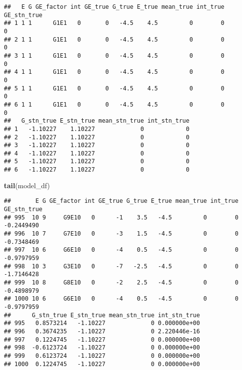 \documentclass[]{article}
\newenvironment{Shaded}{\begin{snugshade}}{\end{snugshade}}
\newcommand{\DataTypeTok}[1]{\textcolor[rgb]{0.13,0.29,0.53}{#1}}
\newcommand{\DecValTok}[1]{\textcolor[rgb]{0.00,0.00,0.81}{#1}}
\newcommand{\KeywordTok}[1]{\textcolor[rgb]{0.13,0.29,0.53}{\textbf{#1}}}
\newcommand{\NormalTok}[1]{#1}
\newcommand{\OperatorTok}[1]{\textcolor[rgb]{0.81,0.36,0.00}{\textbf{#1}}}
\begin{document}
\begin{verbatim}
##   E G GE_factor int GE_true G_true E_true mean_true int_true GE_stn_true
## 1 1 1      G1E1   0       0   -4.5    4.5         0        0           0
## 2 1 1      G1E1   0       0   -4.5    4.5         0        0           0
## 3 1 1      G1E1   0       0   -4.5    4.5         0        0           0
## 4 1 1      G1E1   0       0   -4.5    4.5         0        0           0
## 5 1 1      G1E1   0       0   -4.5    4.5         0        0           0
## 6 1 1      G1E1   0       0   -4.5    4.5         0        0           0
##   G_stn_true E_stn_true mean_stn_true int_stn_true
## 1   -1.10227    1.10227             0            0
## 2   -1.10227    1.10227             0            0
## 3   -1.10227    1.10227             0            0
## 4   -1.10227    1.10227             0            0
## 5   -1.10227    1.10227             0            0
## 6   -1.10227    1.10227             0            0
\end{verbatim}

\begin{Shaded}
\begin{Highlighting}[]
    \KeywordTok{tail}\NormalTok{(model_df)}
\end{Highlighting}
\end{Shaded}

\begin{verbatim}
##       E G GE_factor int GE_true G_true E_true mean_true int_true GE_stn_true
## 995  10 9     G9E10   0      -1    3.5   -4.5         0        0  -0.2449490
## 996  10 7     G7E10   0      -3    1.5   -4.5         0        0  -0.7348469
## 997  10 6     G6E10   0      -4    0.5   -4.5         0        0  -0.9797959
## 998  10 3     G3E10   0      -7   -2.5   -4.5         0        0  -1.7146428
## 999  10 8     G8E10   0      -2    2.5   -4.5         0        0  -0.4898979
## 1000 10 6     G6E10   0      -4    0.5   -4.5         0        0  -0.9797959
##      G_stn_true E_stn_true mean_stn_true int_stn_true
## 995   0.8573214   -1.10227             0 0.000000e+00
## 996   0.3674235   -1.10227             0 2.220446e-16
## 997   0.1224745   -1.10227             0 0.000000e+00
## 998  -0.6123724   -1.10227             0 0.000000e+00
## 999   0.6123724   -1.10227             0 0.000000e+00
## 1000  0.1224745   -1.10227             0 0.000000e+00
\end{verbatim}

\begin{Shaded}
\end{Shaded}
\end{document}
